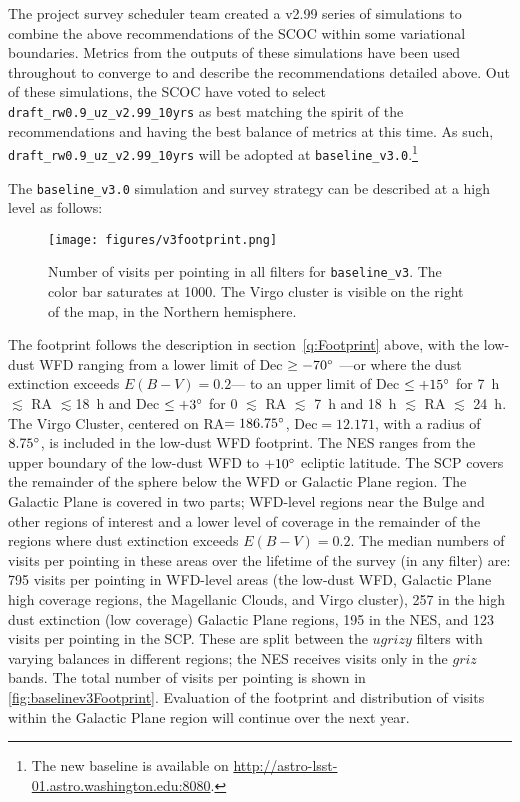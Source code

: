 The project survey scheduler team created a v2.99 series of simulations to combine the above recommendations of the SCOC within some variational boundaries. Metrics from the outputs of these simulations have been used throughout to converge to and describe the recommendations detailed above. Out of these simulations, the SCOC have voted to select \texttt{draft\_rw0.9\_uz\_v2.99\_10yrs} as best matching the spirit of the recommendations and having the best balance of metrics at this time. As such, \texttt{draft\_rw0.9\_uz\_v2.99\_10yrs} will be adopted at \texttt{baseline\_v3.0}.\footnote{The new baseline is available on \url{http://astro-lsst-01.astro.washington.edu:8080}.} 



The \texttt{baseline\_v3.0} simulation and survey strategy can be described at a high level as follows:
\begin{figure*}[h!]
    \centering
    \texttt{[image: figures/v3footprint.png]}
    \caption{Number of visits per pointing in all filters for \texttt{baseline\_v3}. The color bar saturates at 1000. The Virgo cluster is visible on the right of the map, in the Northern hemisphere.%
    }\label{fig:baselinev3Footprint}
\end{figure*}



\setlength\parindent{0.7cm}
\hangindent=0.7cm The footprint follows the description in section~\ref{q:Footprint} above, with the low-dust WFD ranging from a lower limit of Dec $\geq-70^{\circ}$ ---or where the dust extinction exceeds $E(B-V)=0.2$--- to an upper limit of Dec $\leq+15^{\circ}$ for 7~h $\lesssim$ RA $\lesssim$18~h and Dec $\leq+3^{\circ}$ for 0 $\lesssim$ RA $\lesssim$ 7~h and 18~h $\lesssim$ RA $\lesssim$  24~h. The Virgo Cluster, centered on RA$=186.75^{\circ}$, Dec$=12.171$\degree, with a radius of $8.75^{\circ}$, is included in the low-dust WFD footprint. The NES ranges from the upper boundary of the low-dust WFD to $+10^{\circ}$ ecliptic latitude. The SCP covers the remainder of the sphere below the WFD or Galactic Plane region. The Galactic Plane is covered in two parts; WFD-level regions near the Bulge and other regions of interest and a lower level of coverage in the remainder of the regions where dust extinction exceeds $E(B-V)=0.2$.  The median numbers of visits per pointing in these areas over the lifetime of the survey (in any filter) are: 795 visits per pointing in WFD-level areas (the low-dust WFD, Galactic Plane high coverage regions, the Magellanic Clouds, and Virgo cluster), 257 in the high dust extinction (low coverage) Galactic Plane regions, 195 in the NES, and 123 visits per pointing in the SCP. These are split between the $ugrizy$ filters with varying balances in different regions; the NES receives visits only in the $griz$ bands. The total number of visits per pointing is shown in \autoref{fig:baselinev3Footprint}. Evaluation of the footprint and distribution of visits within the Galactic Plane region will continue over the next year.

